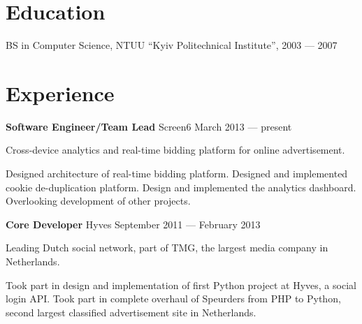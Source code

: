 \documentclass[margin]{res}
\begin{document}

\address{{\bf Address} \\ Czaar Peterstraat 103 \\  Amsterdam \\ The Netherlands}

\address{{\bf Contacts} \\ +31 62 980 61 41 \\ contact@mishkovskyi.net \\ \href{https://github.com/mishok13}{GitHub}}

\begin{resume}


\section{Education}
BS in Computer Science, NTUU ``Kyiv Politechnical Institute'', 2003 --- 2007

\section{Experience}

{\bf Software Engineer/Team Lead} Screen6 \hfill March 2013 --- present

Cross-device analytics and real-time bidding platform for online
advertisement.

Designed architecture of real-time bidding platform. Designed and
implemented cookie de-duplication platform. Design and implemented the
analytics dashboard. Overlooking development of other projects.

{\bf Core Developer} Hyves \hfill September 2011 --- February 2013

Leading Dutch social network, part of TMG, the largest media company
in Netherlands.

Took part in design and implementation of first Python project at
Hyves, a social login API. Took part in complete overhaul of Speurders
from PHP to Python, second largest classified advertisement site in
Netherlands.


\end{resume}
\end{document}
